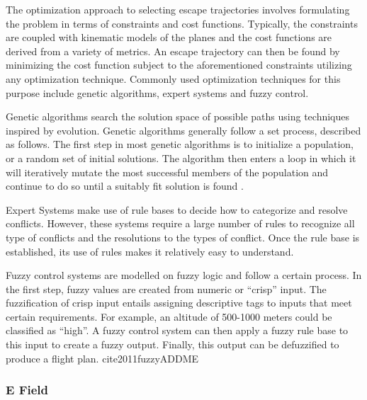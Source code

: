 \documentclass[conference]{IEEEtran}
\begin{document}
The optimization approach to selecting escape trajectories involves formulating the problem in terms of constraints and cost functions.  Typically, the constraints are coupled with kinematic models of the planes and the cost functions are derived from a variety of metrics.  An escape trajectory can then be found by minimizing the cost function subject to the aforementioned constraints utilizing any optimization technique. Commonly used optimization techniques for this purpose include genetic algorithms, expert systems and fuzzy control.

Genetic algorithms search the solution space of possible paths using techniques inspired by evolution.  Genetic algorithms generally follow a set process, described as follows.  The first step in most genetic algorithms is to initialize a population, or a random set of initial solutions.  The algorithm then enters a loop in which it will iteratively mutate the most successful members of the population and continue to do so until a suitably fit solution is found \cite{siudynamic}.

Expert Systems make use of rule bases to decide how to categorize and resolve conflicts.  However, these systems require a large number of rules to recognize all type of conflicts and the resolutions to the types of conflict.  Once the rule base is established, its use of rules makes it relatively easy to understand. \cite{kuchar2000review}

Fuzzy control systems are modelled on fuzzy logic and follow a certain process.  In the first step, fuzzy values are created from numeric or “crisp” input.  The fuzzification of crisp input entails assigning descriptive tags to inputs that meet certain requirements.  For example, an altitude of 500-1000 meters could be classified as “high”.  A fuzzy control system can then apply a fuzzy rule base to this input to create a fuzzy output.  Finally, this output can be defuzzified to produce a flight plan. cite{2011fuzzyADDME}

\subsubsection{E Field}
\end{document}
